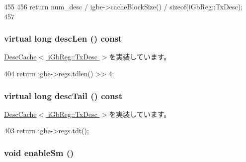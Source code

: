 \begin{DoxyCode}
455         {
456             return num_desc / igbe->cacheBlockSize() / sizeof(iGbReg::TxDesc);
457         }
\end{DoxyCode}
\hypertarget{classIGbE_1_1TxDescCache_a465e4e31be3a89db3d7f9cd1ecc40064}{
\subsubsection[{descLen}]{\setlength{\rightskip}{0pt plus 5cm}virtual long descLen () const}}
\label{classIGbE_1_1TxDescCache_a465e4e31be3a89db3d7f9cd1ecc40064}


\hyperlink{classIGbE_1_1DescCache_a8eb35163568b01fa17aa47b23a80f90c}{DescCache$<$ iGbReg::TxDesc $>$}を実装しています。


\begin{DoxyCode}
404 { return igbe->regs.tdlen() >> 4; }
\end{DoxyCode}
\hypertarget{classIGbE_1_1TxDescCache_a4b6b769be62592fc43518ba480bbd1f7}{
\subsubsection[{descTail}]{\setlength{\rightskip}{0pt plus 5cm}virtual long descTail () const}}
\label{classIGbE_1_1TxDescCache_a4b6b769be62592fc43518ba480bbd1f7}


\hyperlink{classIGbE_1_1DescCache_a88ebc5d9eb88ca9148465557e9a66c1c}{DescCache$<$ iGbReg::TxDesc $>$}を実装しています。


\begin{DoxyCode}
403 { return igbe->regs.tdt(); }
\end{DoxyCode}
\hypertarget{classIGbE_1_1TxDescCache_aec7fdcc540223076999e0f8f07f854bc}{
\subsubsection[{enableSm}]{\setlength{\rightskip}{0pt plus 5cm}void enableSm ()}}
\label{classIGbE_1_1TxDescCache_aec7fdcc540223076999e0f8f07f854bc}


